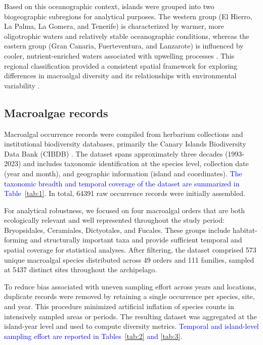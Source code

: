 \documentclass[a4paper,fleqn]{cas-sc}
\DeclareRobustCommand{\added}[1]{\textcolor{blue}{#1}}
\begin{document}
Based on this oceanographic context, islands were grouped into two biogeographic subregions for analytical purposes. The western group (El Hierro, La Palma, La Gomera, and Tenerife) is characterized by warmer, more oligotrophic waters and relatively stable oceanographic conditions, whereas the eastern group (Gran Canaria, Fuerteventura, and Lanzarote) is influenced by cooler, nutrient-enriched waters associated with upwelling processes \citep{Aristegui2009, Bianchi2012}. This regional classification provided a consistent spatial framework for exploring differences in macroalgal diversity and its relationships with environmental variability \citep{Duffy2019Toward}.

\subsection{Macroalgae records}

Macroalgal occurrence records were compiled from herbarium collections and institutional biodiversity databases, primarily the Canary Islands Biodiversity Data Bank (CIBDB) \citep{RIERA2015}. The dataset spans approximately three decades (1993-2023) and includes taxonomic identification at the species level, collection date (year and month), and geographic information (island and coordinates). \added{The taxonomic breadth and temporal coverage of the dataset are summarized in Table~\ref{tab:1}.} In total, 64391 raw occurrence records were initially assembled.

For analytical robustness, we focused on four macroalgal orders that are both ecologically relevant and well represented throughout the study period: Bryopsidales, Ceramiales, Dictyotales, and Fucales. These groups include habitat-forming and structurally important taxa and provide sufficient temporal and spatial coverage for statistical analyses. After filtering, the dataset comprised 573 unique macroalgal species distributed across 49 orders and 111 families, sampled at 5437 distinct sites throughout the archipelago. 

To reduce bias associated with uneven sampling effort across years and locations, duplicate records were removed by retaining a single occurrence per species, site, and year. This procedure minimized artificial inflation of species counts in intensively sampled areas or periods. The resulting dataset was aggregated at the island-year level and used to compute diversity metrics. \added{Temporal and island-level sampling effort are reported in Tables~\ref{tab:2} and \ref{tab:3}.}
\end{document}
